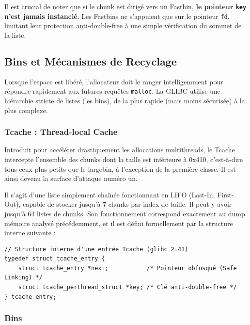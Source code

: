 Il est crucial de noter que si le chunk est dirigé vers un Fastbin, \textbf{le pointeur \texttt{key} n'est jamais instancié}. Les Fastbins ne s'appuient que sur le pointeur \texttt{fd}, limitant leur protection anti-double-free à une simple vérification du sommet de la liste.

\subsection{Bins et Mécanismes de Recyclage}

Lorsque l'espace est libéré, l'allocateur doit le ranger intelligemment pour répondre rapidement aux futures requêtes \texttt{malloc}. La GLIBC utilise une hiérarchie stricte de listes (les bins), de la plus rapide (mais moins sécurisée) à la plus complexe.

\subsubsection{Tcache : Thread-local Cache}

Introduit pour accélérer drastiquement les allocations multithreads,
le Tcache intercepte l’ensemble des chunks dont la taille est inférieure à 0x410,
c’est‑à‑dire tous ceux plus petits que le largebin, à l’exception de la première classe.
Il est ainsi devenu la surface d’attaque numéro un.

Il s’agit d’une liste simplement chaînée fonctionnant en LIFO (Last-In, First-Out),
capable de stocker jusqu’à 7 chunks par index de taille.
Il peut y avoir jusqu’à 64 listes de chunks.
Son fonctionnement correspond exactement au dump mémoire analysé précédemment,
et il est défini formellement par la structure interne suivante :

\begin{verbatim}
// Structure interne d'une entrée Tcache (glibc 2.41)
typedef struct tcache_entry { 
    struct tcache_entry *next;           /* Pointeur obfusqué (Safe Linking) */ 
    struct tcache_perthread_struct *key; /* Clé anti-double-free */ 
} tcache_entry; 
\end{verbatim}

\subsubsection{Bins}

